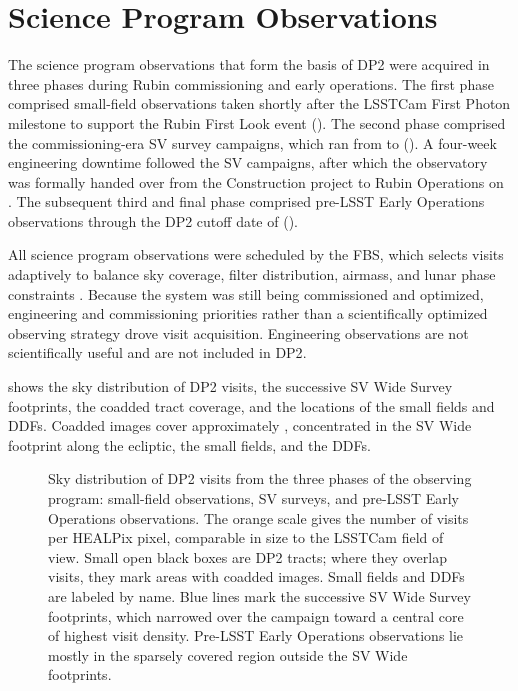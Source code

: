 \section{Science Program Observations}
\label{sec:science_program}
%
The science program observations that form the basis of \gls{DP2} were acquired in three phases during Rubin commissioning and early operations.
The first phase comprised small-field observations taken shortly after the \gls{LSSTCam} First Photon milestone to support the Rubin First Look event ().
The second phase comprised the commissioning-era \gls{SV} survey campaigns, which ran from \svcampaignstartdate to \svcampaignenddate ().
A four-week engineering downtime followed the \gls{SV} campaigns, after which the observatory was formally handed over from the Construction project to Rubin \gls{Operations} on \startoperations.
The subsequent third and final phase comprised pre-\gls{LSST} Early \gls{Operations} observations through the \gls{DP2} cutoff date of \dptwoenddate ().

All science program observations were scheduled by the \gls{FBS}, which selects visits adaptively to balance sky coverage, filter distribution, airmass, and lunar phase constraints \citep[][]{2026SPIE14151E..0XJ}.
Because the system was still being commissioned and optimized, engineering and commissioning priorities rather than a scientifically optimized observing strategy drove visit acquisition.
Engineering observations are not scientifically useful and are not included in \gls{DP2}.

 shows the sky distribution of \gls{DP2} visits, the successive \gls{SV} Wide Survey footprints, the coadded \gls{tract} coverage, and the locations of the small fields and \glspl{DDF}.
Coadded images cover approximately \coaddedarea, concentrated in the \gls{SV} Wide \gls{footprint} along the ecliptic, the small fields, and the \glspl{DDF}.
%
\begin{figure}[hbt!]
\caption{Sky distribution of \gls{DP2} visits from the three phases of the observing program: small-field observations, \gls{SV} surveys, and pre-\gls{LSST} Early \gls{Operations} observations.
The orange scale gives the number of visits per \gls{HEALPix} pixel, comparable in size to the \gls{LSSTCam} field of view.
Small open black boxes are \gls{DP2} tracts; where they overlap visits, they mark areas with coadded images.
Small fields and \glspl{DDF} are labeled by name.
Blue lines mark the successive \gls{SV} Wide Survey footprints, which narrowed over the campaign toward a central core of highest visit density.
Pre-\gls{LSST} Early \gls{Operations} observations lie mostly in the sparsely covered region outside the \gls{SV} Wide footprints.}
\label{fig:dp2_sky}
\end{figure}


